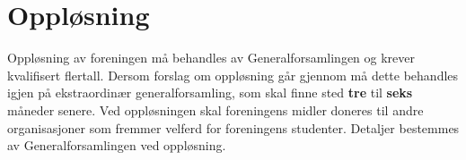 \section{Oppløsning}
Oppløsning av foreningen må behandles av Generalforsamlingen og krever kvalifisert flertall. 
Dersom forslag om oppløsning går gjennom må dette behandles igjen på ekstraordinær generalforsamling, 
som skal finne sted \textbf{tre} til \textbf{seks} måneder senere. 
Ved oppløsningen skal foreningens midler doneres til andre organisasjoner som fremmer velferd 
for foreningens studenter. Detaljer bestemmes av Generalforsamlingen ved oppløsning.
